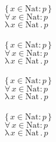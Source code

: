 \documentclass{article}
\begin{document}
\noindent
\(\{\,x\in\mathrm{Nat}\mathpunct{:} p\,\}\)\\
\(\forall\, x\in\mathrm{Nat}\mathpunct{:} p\)\\
\(\mathrm{\lambda}\, x\in\mathrm{Nat}\mathpunct{.} p\)\\\\

\noindent
\(\{\,x\in\mathrm{Nat}\mathrel{:} p\,\}\)\\
\(\forall\, x\in\mathrm{Nat}\mathrel{:} p\)\\
\(\mathrm{\lambda}\, x\in\mathrm{Nat}\mathrel{.} p\)\\\\

\noindent
\(\{\,x\in\mathrm{Nat}\mathpunct{\colon} p\,\}\)\\
\(\forall\, x\in\mathrm{Nat}\mathpunct{:} p\)\\
\(\mathrm{\lambda}\, x\in\mathrm{Nat}\mathpunct{.} p\)\\\\

\noindent
\(\{\,x\in\mathrm{Nat}\mathrel{\colon} p\,\}\)\\
\(\forall\, x\in\mathrm{Nat}\mathrel{:} p\)\\
\(\mathrm{\lambda}\, x\in\mathrm{Nat}\mathrel{.} p\)
\end{document}
